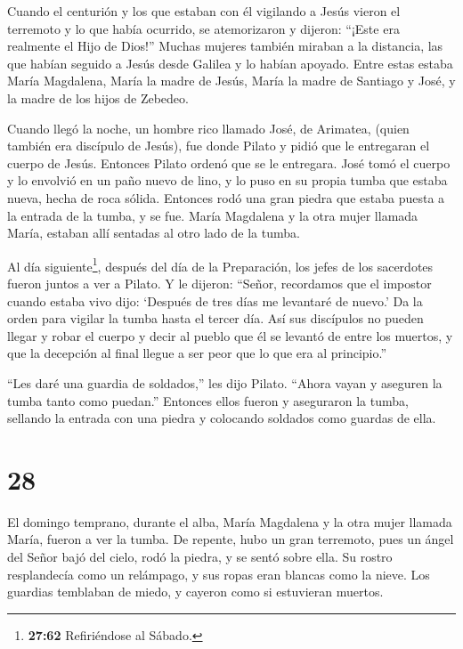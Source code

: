 Cuando el centurión y los que estaban con él vigilando a
Jesús vieron el terremoto y lo que había ocurrido, se atemorizaron y
dijeron: ``¡Este era realmente el Hijo de Dios!''  Muchas
mujeres también miraban a la distancia, las que habían seguido a Jesús
desde Galilea y lo habían apoyado.  Entre estas estaba
María Magdalena, María la madre de Jesús, María la madre de Santiago y
José, y la madre de los hijos de Zebedeo.

 Cuando llegó la noche, un hombre rico llamado José, de
Arimatea, (quien también era discípulo de Jesús),  fue
donde Pilato y pidió que le entregaran el cuerpo de Jesús. Entonces
Pilato ordenó que se le entregara.  José tomó el cuerpo y
lo envolvió en un paño nuevo de lino,  y lo puso en su
propia tumba que estaba nueva, hecha de roca sólida. Entonces rodó una
gran piedra que estaba puesta a la entrada de la tumba, y se fue.
 María Magdalena y la otra mujer llamada María, estaban
allí sentadas al otro lado de la tumba.

 Al día siguiente\footnote{\textbf{27:62} Refiriéndose al
  Sábado.}, después del día de la Preparación, los jefes de los
sacerdotes fueron juntos a ver a Pilato.  Y le dijeron:
``Señor, recordamos que el impostor cuando estaba vivo dijo: `Después de
tres días me levantaré de nuevo.'  Da la orden para vigilar
la tumba hasta el tercer día. Así sus discípulos no pueden llegar y
robar el cuerpo y decir al pueblo que él se levantó de entre los
muertos, y que la decepción al final llegue a ser peor que lo que era al
principio.''

 ``Les daré una guardia de soldados,'' les dijo Pilato.
``Ahora vayan y aseguren la tumba tanto como puedan.'' 
Entonces ellos fueron y aseguraron la tumba, sellando la entrada con una
piedra y colocando soldados como guardas de ella.

\hypertarget{section-27}{%
\section{28}\label{section-27}}

 El domingo temprano, durante el alba, María Magdalena y la
otra mujer llamada María, fueron a ver la tumba.  De
repente, hubo un gran terremoto, pues un ángel del Señor bajó del cielo,
rodó la piedra, y se sentó sobre ella.  Su rostro
resplandecía como un relámpago, y sus ropas eran blancas como la nieve.
 Los guardias temblaban de miedo, y cayeron como si
estuvieran muertos.

